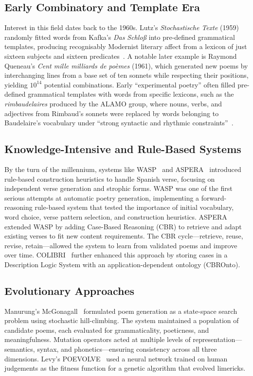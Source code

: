 \documentclass[conference]{IEEEtran}
\begin{document}
\subsection{Early Combinatory and Template Era}
Interest in this field dates back to the 1960s. Lutz's \textit{Stochastische Texte} (1959) randomly fitted words from Kafka's \textit{Das Schlo\ss} into pre-defined grammatical templates, producing recognisably Modernist literary affect from a lexicon of just sixteen subjects and sixteen predicates~\cite{colton2012face}. A notable later example is Raymond Queneau's \textit{Cent mille milliards de po\`emes} (1961), which generated new poems by interchanging lines from a base set of ten sonnets while respecting their positions, yielding $10^{14}$ potential combinations. Early ``experimental poetry'' often filled pre-defined grammatical templates with words from specific lexicons, such as the \textit{rimbaudelaires} produced by the ALAMO group, where nouns, verbs, and adjectives from Rimbaud's sonnets were replaced by words belonging to Baudelaire's vocabulary under ``strong syntactic and rhythmic constraints''~\cite{oliveira2009survey}.

\subsection{Knowledge-Intensive and Rule-Based Systems}
By the turn of the millennium, systems like WASP~\cite{gervas2000wasp} and ASPERA~\cite{gervas2001aspera} introduced rule-based construction heuristics to handle Spanish verse, focusing on independent verse generation and strophic forms. WASP was one of the first serious attempts at automatic poetry generation, implementing a forward-reasoning rule-based system that tested the importance of initial vocabulary, word choice, verse pattern selection, and construction heuristics. ASPERA extended WASP by adding Case-Based Reasoning (CBR) to retrieve and adapt existing verses to fit new content requirements. The CBR cycle---retrieve, reuse, revise, retain---allowed the system to learn from validated poems and improve over time. COLIBRI~\cite{diaz2002colibri} further enhanced this approach by storing cases in a Description Logic System with an application-dependent ontology (CBROnto).

\subsection{Evolutionary Approaches}
Manurung's McGonagall~\cite{manurung2004thesis} formulated poem generation as a state-space search problem using stochastic hill-climbing. The system maintained a population of candidate poems, each evaluated for grammaticality, poeticness, and meaningfulness. Mutation operators acted at multiple levels of representation---semantics, syntax, and phonetics---ensuring consistency across all three dimensions. Levy's POEVOLVE~\cite{levy2001poevolve} used a neural network trained on human judgements as the fitness function for a genetic algorithm that evolved limericks.
\end{document}
